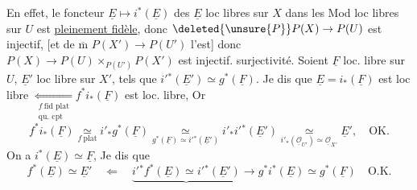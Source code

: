 En effet,  le foncteur $\underline E\mapsto i^*(\underline E)$ des $\underline E$ loc libres sur $X$ dans les Mod loc libres sur $U$ est \uline{pleinement fidèle}, donc $\deleted{\unsure{P}}P(X)\to P(U)$ est injectif, [et de $\overline{\mathrm m}$ $P(X')\to P(U')$ l'est] donc $P(X)\to P(U)\times_{P(U')}P(X')$ est injectif.   surjectivité. Soient $\underline F$ loc. libre sur $U$, $\underline E'$ loc libre sur $X'$, tels que $i'{}^*(\underline E')\simeq g^*(\underline F)$. Je dis que $\underline E=i_*(\underline F)$ est loc libre $\underset{\substack{f\ \text{fid plat}\\\text{qu. cpt}}}{\Leftarrow} f^* i_*(\underline F)$ est loc. libre, Or
\[
f^*i_*(\underline F)\underset{f\ \mathrm{plat}}{\simeq} i'_*g^*(\underline F)\underset{g^*(\underline F)\simeq i'{}^*(\underline E')}{\simeq} i'_*i'{}^*(\underline E')\underset{i'_*(\underline{\mathcal O}_{U'})\simeq\underline{\mathcal O}_{X'}}{\simeq}\underline E',\quad\text{OK.}
\]
On a $i^*(\underline E)\simeq\underline F$, Je dis que
\[
 f^*(\underline E)\simeq\underline E'\quad \Longleftarrow\quad
 \underbrace{i'{}^*f^*(\underline E)\simeq i'{}^*(\underline E')}\longrightarrow
 g^*i^*(\underline E)\simeq g^*(\underline F)
 \quad\text{O.K.}
\]


